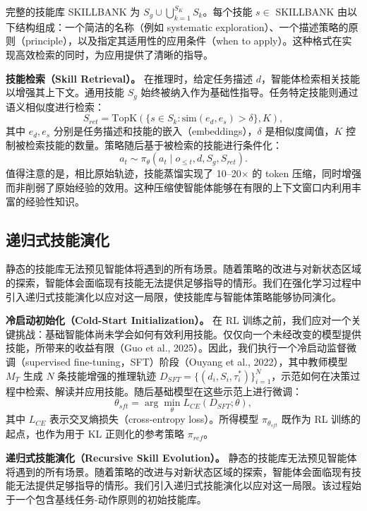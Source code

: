 \documentclass[11pt,UTF8,fontset=fandol]{ctexart}
\begin{document}
完整的技能库 SKILLBANK 为 $S_g \cup \bigcup_{k=1}^{S_K} S_k$。每个技能 $s \in$ SKILLBANK 由以下结构组成：一个简洁的名称（例如 systematic exploration）、一个描述策略的原则（principle），以及指定其适用性的应用条件（when to apply）。这种格式在实现高效检索的同时，为应用提供了清晰的指导。

\textbf{技能检索（Skill Retrieval）。} 在推理时，给定任务描述 $d$，智能体检索相关技能以增强其上下文。通用技能 $S_g$ 始终被纳入作为基础性指导。任务特定技能则通过语义相似度进行检索：
\begin{equation}
S_{ret} = \text{TopK}(\{s \in S_k : \text{sim}(e_d, e_s) > \delta\}, K),
\end{equation}
其中 $e_d, e_s$ 分别是任务描述和技能的嵌入（embeddings），$\delta$ 是相似度阈值，$K$ 控制被检索技能的数量。策略随后基于被检索的技能进行条件化：
\begin{equation}
a_t \sim \pi_\theta(a_t \mid o_{\le t}, d, S_g, S_{ret}).
\end{equation}
值得注意的是，相比原始轨迹，技能蒸馏实现了 10--20$\times$ 的 token 压缩，同时增强而非削弱了原始经验的效用。这种压缩使智能体能够在有限的上下文窗口内利用丰富的经验性知识。

\subsection{递归式技能演化}

静态的技能库无法预见智能体将遇到的所有场景。随着策略的改进与对新状态区域的探索，智能体会面临现有技能无法提供足够指导的情形。我们在强化学习过程中引入递归式技能演化以应对这一局限，使技能库与智能体策略能够协同演化。

\textbf{冷启动初始化（Cold-Start Initialization）。} 在 RL 训练之前，我们应对一个关键挑战：基础智能体尚未学会如何有效利用技能。仅仅向一个未经改变的模型提供技能，所带来的收益有限（Guo et al., 2025）。因此，我们执行一个冷启动监督微调（supervised fine-tuning，SFT）阶段（Ouyang et al., 2022），其中教师模型 $M_T$ 生成 $N$ 条技能增强的推理轨迹 $D_{SFT} = \{(d_i, S_i, \tau_i^*)\}_{i=1}^N$，示范如何在决策过程中检索、解读并应用技能。随后基础模型在这些示范上进行微调：
\begin{equation}
\theta_{sft} = \arg\min_\theta L_{CE}(D_{SFT}; \theta),
\end{equation}
其中 $L_{CE}$ 表示交叉熵损失（cross-entropy loss）。所得模型 $\pi_{\theta_{sft}}$ 既作为 RL 训练的起点，也作为用于 KL 正则化的参考策略 $\pi_{ref}$。

\textbf{递归式技能演化（Recursive Skill Evolution）。} 静态的技能库无法预见智能体将遇到的所有场景。随着策略的改进与对新状态区域的探索，智能体会面临现有技能无法提供足够指导的情形。我们引入递归式技能演化以应对这一局限。该过程始于一个包含基线任务-动作原则的初始技能库。
\end{document}

